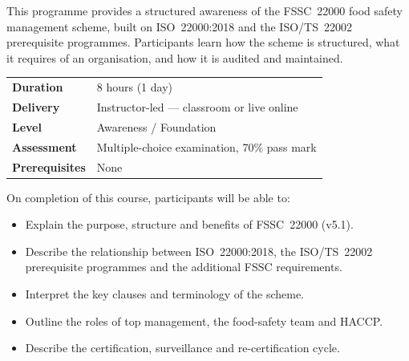 %

This programme provides a structured awareness of the FSSC~22000 food safety
management scheme, built on ISO~22000:2018 and the ISO/TS~22002 prerequisite
programmes. Participants learn how the scheme is structured, what it requires
of an organisation, and how it is audited and maintained.

\vspace{6pt}
\begin{tabular}{@{}p{3.2cm}p{9cm}@{}}
  \textbf{Duration}   & 8 hours (1 day) \\[2pt]
  \textbf{Delivery}   & Instructor-led — classroom or live online \\[2pt]
  \textbf{Level}      & Awareness / Foundation \\[2pt]
  \textbf{Assessment} & Multiple-choice examination, 70\% pass mark \\[2pt]
  \textbf{Prerequisites} & None \\
\end{tabular}

On completion of this course, participants will be able to:
\begin{itemize}\setlength\itemsep{2pt}
  \item Explain the purpose, structure and benefits of FSSC~22000 (v5.1).
  \item Describe the relationship between ISO~22000:2018, the ISO/TS~22002
        prerequisite programmes and the additional FSSC requirements.
  \item Interpret the key clauses and terminology of the scheme.
  \item Outline the roles of top management, the food-safety team and HACCP.
  \item Describe the certification, surveillance and re-certification cycle.
\end{itemize}

